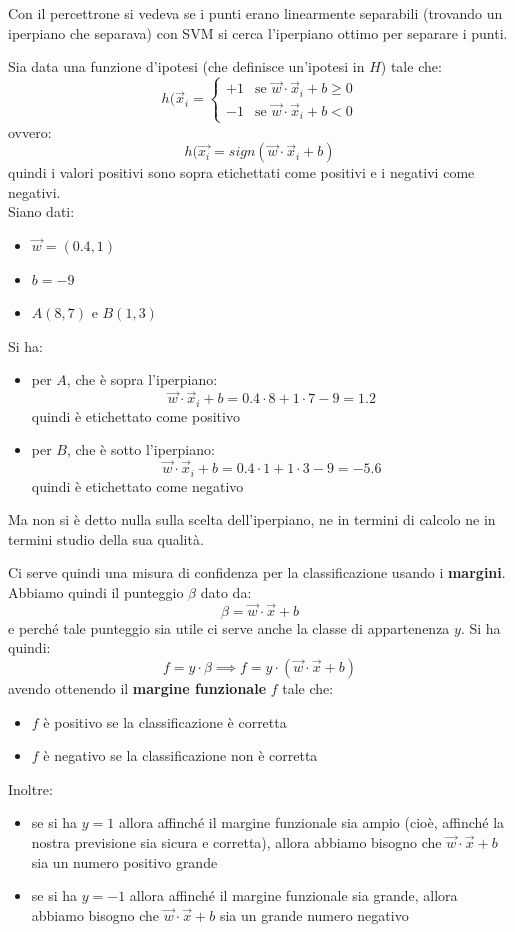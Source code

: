 Con il percettrone si vedeva se i punti erano linearmente separabili (trovando
un iperpiano che separava) con SVM si cerca l'iperpiano ottimo per separare i
punti.
\begin{esempio}
  Sia data una funzione d'ipotesi (che definisce un'ipotesi in $H$) tale che:
  \[h(\vec{x}_i=
    \begin{cases}
      +1&\mbox{se }\vec{w}\cdot\vec{x}_i+b\geq 0\\
      -1&\mbox{se }\vec{w}\cdot\vec{x}_i+b< 0
    \end{cases}
  \]
  ovvero:
  \[h(\vec{x_i}=sign(\vec{w}\cdot\vec{x}_i+b)\]
  quindi i valori positivi sono sopra etichettati come positivi e i negativi
  come  negativi.\\
  Siano dati:
  \begin{itemize}
    \item $\vec{w}=(0.4, 1)$
    \item $b=-9$
    \item $A(8, 7)$ e $B(1, 3)$
  \end{itemize}
  Si ha:
  \begin{itemize}
    \item per $A$, che è sopra l'iperpiano:
    \[\vec{w}\cdot\vec{x}_i+b=0.4\cdot 8+1\cdot 7-9=1.2\]
    quindi è etichettato come positivo
    \item per $B$, che è sotto l'iperpiano:
    \[\vec{w}\cdot\vec{x}_i+b=0.4\cdot 1+1\cdot 3-9=-5.6\]
    quindi è etichettato come negativo
  \end{itemize}
  Ma non si è detto nulla sulla scelta dell'iperpiano, ne in termini di calcolo
  ne in termini studio della sua qualità.
\end{esempio}
Ci serve quindi una misura di confidenza per la classificazione usando i
\textbf{margini}. \\
Abbiamo quindi il punteggio $\beta$ dato da:
\[\beta=\vec{w}\cdot\vec{x}+b\]
e perché tale punteggio sia utile ci serve anche la classe di appartenenza
$y$. Si ha quindi:
\[f=y\cdot\beta\implies f=y\cdot(\vec{w}\cdot\vec{x}+b)\]
avendo ottenendo il \textbf{margine funzionale} $f$ tale che:
\begin{itemize}
  \item $f$ è positivo se la classificazione è corretta
  \item $f$ è negativo se la classificazione non è corretta
\end{itemize}
Inoltre:
\begin{itemize}
  \item se si ha $y=1$ allora affinché il margine funzionale sia ampio (cioè,
  affinché la nostra previsione sia sicura e corretta), allora abbiamo bisogno
  che $\vec{w}\cdot\vec{x}+b$ sia un numero positivo grande 
  \item se si ha $y=-1$ allora affinché il margine funzionale sia grande, allora
  abbiamo bisogno che $\vec{w}\cdot\vec{x}+b$ sia un grande numero negativo 
\end{itemize}

